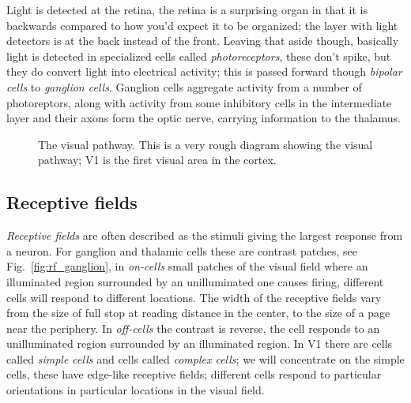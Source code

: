 \documentclass[11pt,a4paper]{scrartcl}
\begin{document}
Light is detected at the retina, the retina is a surprising organ in
that it is backwards compared to how you'd expect it to be organized;
the layer with light detectors is at the back instead of the
front. Leaving that aside though, basically light is detected in
specialized cells called \textsl{photoreceptors}, these don't spike,
but they do convert light into electrical activity; this is passed
forward though \textsl{bipolar cells} to \textsl{ganglion
  cells}. Ganglion cells aggregate activity from a number of
photoreptors, along with activity from some inhibitory cells in the
intermediate layer and their axons form the optic nerve, carrying
information to the thalamus.

\begin{figure}
\begin{center}
\end{center}
\caption{The visual pathway. This is a very rough diagram showing the visual pathway; V1 is the first visual area in the cortex.\label{fig:pathway}}
\end{figure}

\subsection*{Receptive fields}
\textsl{Receptive fields} are often described as the stimuli giving
the largest response from a neuron. For ganglion and thalamic cells
these are contrast patches, see Fig.~\ref{fig:rf_ganglion}, in
\textsl{on-cells} small patches of the visual field where an
illuminated region surrounded by an unilluminated one causes firing,
different cells will respond to different locations. The width of the
receptive fields vary from the size of full stop at reading distance
in the center, to the size of a page near the periphery. In
\textsl{off-cells} the contrast is reverse, the cell responds to an
unilluminated region surrounded by an illuminated region. In V1 there
are cells called \textsl{simple cells} and cells called
\textsl{complex cells}; we will concentrate on the simple cells, these
have edge-like receptive fields; different cells respond to particular
orientations in particular locations in the visual field. 
\end{document}
